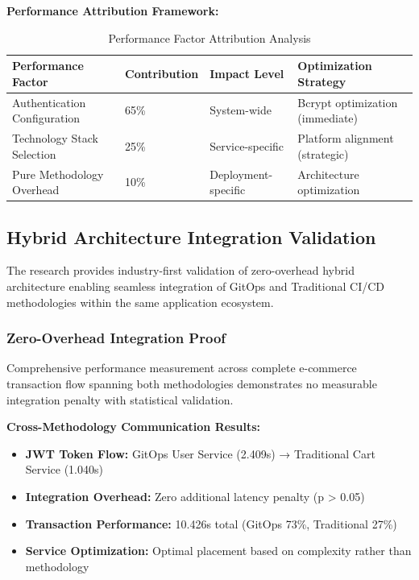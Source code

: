 \textbf{Performance Attribution Framework:}
\begin{table}[H]
\centering
\caption{Performance Factor Attribution Analysis}
\label{tab:performance_attribution}
\begin{tabular}{|p{4cm}|p{2.5cm}|p{3cm}|p{4.5cm}|}
\hline
\textbf{Performance Factor} & \textbf{Contribution} & \textbf{Impact Level} & \textbf{Optimization Strategy} \\
\hline
Authentication Configuration & 65\% & System-wide & Bcrypt optimization (immediate) \\
\hline
Technology Stack Selection & 25\% & Service-specific & Platform alignment (strategic) \\
\hline
Pure Methodology Overhead & 10\% & Deployment-specific & Architecture optimization \\
\hline
\end{tabular}
\end{table}

\subsection{Hybrid Architecture Integration Validation}
\label{subsec:hybrid_validation}

The research provides industry-first validation of zero-overhead hybrid architecture enabling seamless integration of GitOps and Traditional CI/CD methodologies within the same application ecosystem.

\subsubsection{Zero-Overhead Integration Proof}

Comprehensive performance measurement across complete e-commerce transaction flow spanning both methodologies demonstrates no measurable integration penalty with statistical validation.

\textbf{Cross-Methodology Communication Results:}
\begin{itemize}
\item \textbf{JWT Token Flow:} GitOps User Service (2.409s) → Traditional Cart Service (1.040s)
\item \textbf{Integration Overhead:} Zero additional latency penalty (p > 0.05)
\item \textbf{Transaction Performance:} 10.426s total (GitOps 73\%, Traditional 27\%)
\item \textbf{Service Optimization:} Optimal placement based on complexity rather than methodology
\end{itemize}

